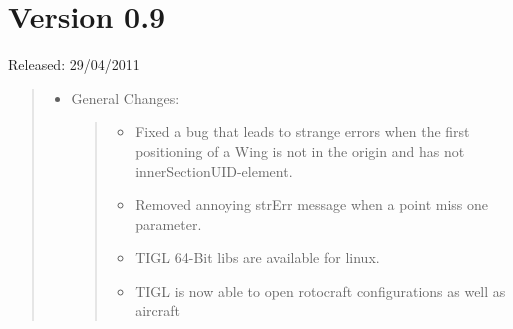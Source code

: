 \documentclass[]{scrartcl}
\begin{document}
\section{Version 0.9}

Released: 29/04/2011

\begin{quote}
\begin{itemize}
\item
  General Changes:

  \begin{quote}
  \begin{itemize}
  \itemsep1pt\parskip0pt
  \item
    Fixed a bug that leads to strange errors when the first positioning
    of a Wing is not in the origin and has not innerSectionUID-element.
  \item
    Removed annoying strErr message when a point miss one parameter.
  \item
    TIGL 64-Bit libs are available for linux.
  \item
    TIGL is now able to open rotocraft configurations as well as
    aircraft
  \end{itemize}
  \end{quote}
\end{itemize}
\end{quote}
\end{document}
